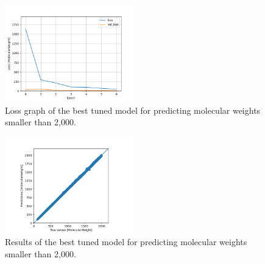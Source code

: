     \begin{figure}
        \centering
        \includegraphics[width=0.5\textwidth]{model_23_7_epochs_loss_MolecularWeight.png}
        \caption{Loss graph of the best tuned model for predicting molecular weights smaller than 2,000.}
        \label{fig:model23-mol-weight-loss}
    \end{figure}
    \begin{figure}
        \centering
        \includegraphics[width=0.5\textwidth]{model_23_7_epochs_predictions_MolecularWeight.png}
        \caption{Results of the best tuned model for predicting molecular weights smaller than 2,000.}
        \label{fig:model23-mol-weight-predictions}
    \end{figure}
    
